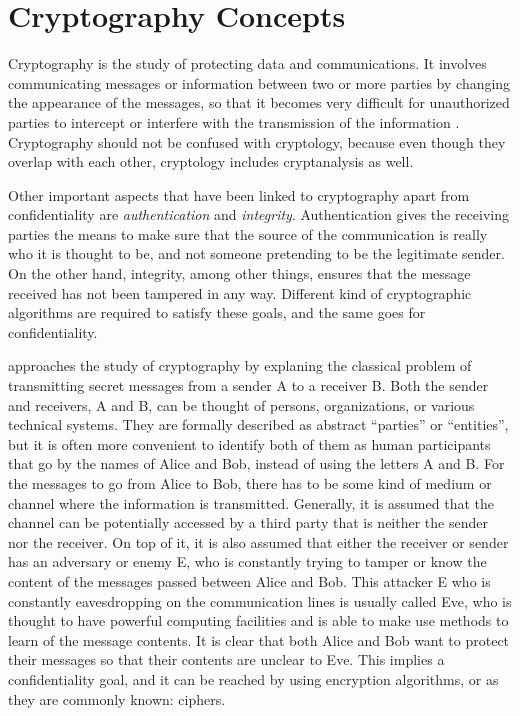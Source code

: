 \section{Cryptography Concepts}

Cryptography is the study of protecting data and communications. It involves communicating messages or information between two or more parties by changing the appearance of the messages, so that it becomes very difficult for unauthorized parties to intercept or interfere with the transmission of the information \cite{IntroCryptoMath}. Cryptography should not be confused with cryptology, because even though they overlap with each other, cryptology includes cryptanalysis as well. 

Other important aspects that have been linked to cryptography apart from confidentiality are \textit{authentication} and \textit{integrity}. Authentication gives the receiving parties the means to make sure that the source of the communication is really who it is thought to be, and not someone pretending to be the legitimate sender. On the other hand, integrity, among other things, ensures that the message received has not been tampered in any way. Different kind of cryptographic algorithms are required to satisfy these goals, and the same goes for confidentiality.

\cite{CryptoIT} approaches the study of cryptography by explaning the classical problem of transmitting secret messages from a sender A to a receiver B. Both the sender and receivers, A and B, can be thought of persons, organizations, or various technical systems.  They are formally described as abstract ``parties'' or ``entities'', but it is often more convenient to identify both of them as human participants that go by the names of Alice and Bob, instead of using the letters A and B.
For the messages to go from Alice to Bob, there has to be some kind of medium or channel where the information is transmitted. Generally, it is assumed that the channel can be potentially accessed by a third party that is neither the sender nor the receiver. On top of it, it is also assumed that either the receiver or sender has an adversary or enemy E, who is constantly trying to tamper or know the content of the messages passed between Alice and Bob. This attacker E who is constantly eavesdropping on the communication lines is usually called Eve, who is thought to have powerful computing facilities and is able to make use methods to learn of the message contents.  It is clear that both Alice and Bob want to protect their messages so that their contents are unclear to Eve. This implies a confidentiality goal, and it can be reached by using encryption algorithms, or as they are commonly known: ciphers.

